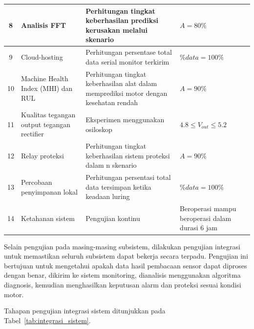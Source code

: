 \documentclass{elsinta}
\begin{document}
\begin{longtable}{|c|p{4.5cm}|p{4.2cm}|p{4cm}|}
8 &
Analisis FFT &
Perhitungan tingkat keberhasilan prediksi kerusakan melalui skenario &
$A=80\%$\\
\hline

9 &
Cloud-hosting &
Perhitungan persentase total data serial monitor terkirim&
$\%data=100\%$\\
\hline

10 &
Machine Health Index (MHI) dan RUL&
Perhitungan tingkat keberhasilan alat dalam memprediksi motor dengan kesehatan rendah&
$A=90\%$\\
\hline

11 &
Kualitas tegangan output tegangan rectifier&
Eksperimen menggunakan osiloskop &
$4.8 \leq V_{out} \leq 5.2$\\
\hline

12 &
Relay proteksi &
Perhitungan tingkat keberhasilan sistem proteksi dalam n skenario&
$A=90\%$\\
\hline

13 &
Percobaan penyimpanan lokal&
Perhitungan persentasi total data tersimpan ketika keadaan luring &
$\%data = 100\%$\\
\hline

14 &
Ketahanan sistem &
Pengujian kontinu &
Beroperasi mampu beroperasi dalam durasi 6 jam\\
\hline
\end{longtable}

Selain pengujian pada masing-masing subsistem, dilakukan pengujian integrasi untuk memastikan seluruh subsistem dapat bekerja secara terpadu. Pengujian ini bertujuan untuk mengetahui apakah data hasil pembacaan sensor dapat diproses dengan benar, dikirim ke sistem monitoring, dianalisis menggunakan algoritma diagnosis, kemudian menghasilkan keputusan alarm dan proteksi sesuai kondisi motor.

Tahapan pengujian integrasi sistem ditunjukkan pada Tabel~\ref{tab:integrasi_sistem}.
\end{document}
